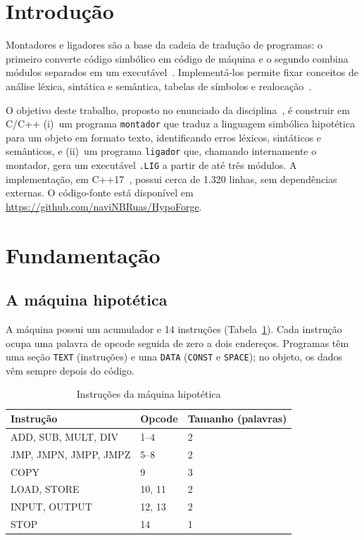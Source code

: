 \documentclass[conference]{IEEEtran}
\begin{document}
\section{Introdução}
Montadores e ligadores são a base da cadeia de tradução de programas: o primeiro converte código simbólico em código de máquina e o segundo combina módulos separados em um executável~\cite{beck,levine}. Implementá-los permite fixar conceitos de análise léxica, sintática e semântica, tabelas de símbolos e realocação~\cite{aho}.

O objetivo deste trabalho, proposto no enunciado da disciplina~\cite{enunciado}, é construir em C/C++ (i)~um programa \texttt{montador} que traduz a linguagem simbólica hipotética para um objeto em formato texto, identificando erros léxicos, sintáticos e semânticos, e (ii)~um programa \texttt{ligador} que, chamando internamente o montador, gera um executável \texttt{.LIG} a partir de até três módulos. A implementação, em C++17~\cite{cpp17}, possui cerca de 1.320 linhas, sem dependências externas. O código-fonte está disponível em \url{https://github.com/naviNBRuas/HypoForge}.

\section{Fundamentação}
\subsection{A máquina hipotética}
A máquina possui um acumulador e 14 instruções (Tabela~\ref{tab:isa}). Cada instrução ocupa uma palavra de opcode seguida de zero a dois endereços. Programas têm uma seção \texttt{TEXT} (instruções) e uma \texttt{DATA} (\texttt{CONST} e \texttt{SPACE}); no objeto, os dados vêm sempre depois do código.

\begin{table}[!htbp]
\centering
\caption{Instruções da máquina hipotética}\label{tab:isa}
\begin{tabular}{p{2.5cm} p{1.2cm} p{3.3cm}}
\toprule
\textbf{Instrução} & \textbf{Opcode} & \textbf{Tamanho (palavras)}\\
\midrule
ADD, SUB, MULT, DIV & 1--4 & 2\\
JMP, JMPN, JMPP, JMPZ & 5--8 & 2\\
COPY & 9 & 3\\
LOAD, STORE & 10, 11 & 2\\
INPUT, OUTPUT & 12, 13 & 2\\
STOP & 14 & 1\\
\bottomrule
\end{tabular}
\end{table}
\end{document}
